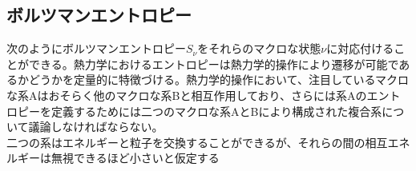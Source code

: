 \documentclass{ltjsarticle}
\begin{document}

  \subsection{ボルツマンエントロピー}
    次のようにボルツマンエントロピー$S_\nu$をそれらのマクロな状態$\nu$に対応付けることができる。熱力学におけるエントロピーは熱力学的操作により遷移が可能であるかどうかを定量的に特徴づける。熱力学的操作において、注目しているマクロな系Aはおそらく他のマクロな系Bと相互作用しており、さらには系Aのエントロピーを定義するためには二つのマクロな系AとBにより構成された複合系について議論しなければならない。\\
    二つの系はエネルギーと粒子を交換することができるが、それらの間の相互エネルギーは無視できるほど小さいと仮定する
\end{document}
